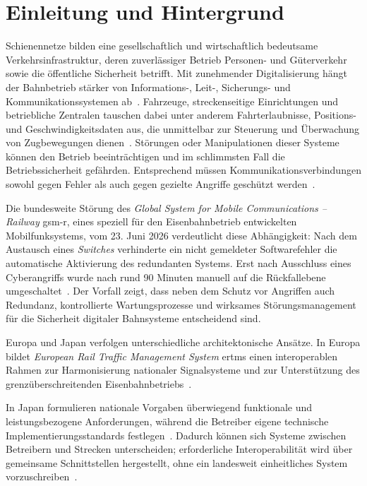 \documentclass[runningheads]{res/llncs}
\begin{document}
\section{Einleitung und Hintergrund}
\label{sec:Einleitung_und_Hintergrund}
Schienennetze bilden eine gesellschaftlich und wirtschaftlich bedeutsame Verkehrsinfrastruktur, deren zuverlässiger Betrieb Personen- und Güterverkehr sowie die öffentliche Sicherheit betrifft.
Mit zunehmender Digitalisierung hängt der Bahnbetrieb stärker von Informations-, Leit-, Sicherungs- und Kommunikationssystemen ab~\parencite[S. 3–4]{xiangliuCyber2020}. Fahrzeuge, streckenseitige Einrichtungen und betriebliche Zentralen tauschen dabei unter anderem Fahrterlaubnisse, Positions- und Geschwindigkeitsdaten aus, die unmittelbar zur Steuerung und Überwachung von Zugbewegungen dienen~\parencite[S. 88]{trinckaufETCS2024}. Störungen oder Manipulationen dieser Systeme können den Betrieb beeinträchtigen und im schlimmsten Fall die Betriebssicherheit gefährden. Entsprechend müssen Kommunikationsverbindungen sowohl gegen Fehler als auch gegen gezielte Angriffe geschützt werden~\parencite[S. 204, 207]{trinckaufETCS2024}.

Die bundesweite Störung des \textit{Global System for Mobile Communications – Railway} \gls{gsm-r}, eines speziell für den Eisenbahnbetrieb entwickelten Mobilfunksystems, vom 23. Juni 2026 verdeutlicht diese Abhängigkeit: Nach dem Austausch eines \textit{Switches} verhinderte ein nicht gemeldeter Softwarefehler die automatische Aktivierung des redundanten Systems. Erst nach Ausschluss eines Cyberangriffs wurde nach rund 90 Minuten manuell auf die Rückfallebene umgeschaltet~\cite{dbinfragoUrsacheZugfunkStoerung2026}. Der Vorfall zeigt, dass neben dem Schutz vor Angriffen auch Redundanz, kontrollierte Wartungsprozesse und wirksames Störungsmanagement für die Sicherheit digitaler Bahnsysteme entscheidend sind.

Europa und Japan verfolgen unterschiedliche architektonische Ansätze. In Europa bildet \textit{European Rail Traffic Management System} \gls{ertms} einen interoperablen Rahmen zur Harmonisierung nationaler Signalsysteme und zur Unterstützung des grenzüberschreitenden Eisenbahnbetriebs~\cite{EuropeanCommission_ERTMS_2026}. 

In Japan formulieren nationale Vorgaben überwiegend funktionale und leistungsbezogene Anforderungen, während die Betreiber eigene technische Implementierungsstandards festlegen~\cite{yanaseJapanese2011}. Dadurch können sich Systeme zwischen Betreibern und Strecken unterscheiden; erforderliche Interoperabilität wird über gemeinsame Schnittstellen hergestellt, ohne ein landesweit einheitliches System vorzuschreiben~\cite[S. 2]{MLIT_CBTC_2021}.
\end{document}
